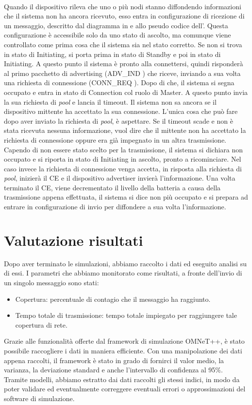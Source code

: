 \\
Quando il dispositivo rileva che uno o più nodi stanno diffondendo informazioni che il sistema non ha ancora ricevuto, esso entra in configurazione di ricezione di un messaggio, descritto dal diagramma in  e allo pseudo codice dell'. Questa configurazione è accessibile solo da uno stato di ascolto, ma comunque viene controllato come prima cosa che il sistema sia nel stato corretto. Se non si trova in stato di Initiating, si porta prima in stato di Standby e poi in stato di Initiating. A questo punto il sistema è pronto alla connettersi, quindi risponderà al primo pacchetto di advertising (ADV\_IND \cite{BT-CoreSpec4.0}) che riceve, inviando a sua volta una richiesta di connessione (CONN\_REQ \cite{BT-CoreSpec4.0}). Dopo di che, il sistema si segna occupato e entra in stato di Connection col ruolo di Master. A questo punto invia la sua richiesta di \textit{pool} e lancia il timeout. Il sistema non sa ancora se il dispositivo mittente ha accettato la sua connessione. L'unica cosa che può fare dopo aver inviato la richiesta di \textit{pool}, è aspettare. Se il timeout scade e non è stata ricevuta nessuna informazione, vuol dire che il mittente non ha accettato la richiesta di connessione oppure era già impegnato in un altra trasmissione. Capendo di non essere stato scelto per la trasmissione, il sistema si dichiara non occupato e si riporta in stato di Initiating in ascolto, pronto a ricominciare. Nel caso invece la richiesta di connessione venga accetta, in risposta alla richiesta di \textit{pool}, inizierà il \acs{CE} e il dispositivo advertiser invierà l'informazione. Una volta terminato il \acs{CE}, viene decrementato il livello della batteria a causa della trasmissione appena effettuata, il sistema si dice non più occupato e si prepara ad entrare in configurazione di invio per diffondere a sua volta l'informazione.
\bigskip

\section{Valutazione risultati}
Dopo aver terminato le simulazioni, abbiamo raccolto i dati ed eseguito analisi su di essi. I parametri che abbiamo monitorato come risultati, a fronte dell'invio di un singolo messaggio sono stati:
\begin{itemize}
	\item Copertura: percentuale di contagio che il messaggio ha raggiunto.
	\item Tempo totale di trasmissione: tempo totale impiegato per raggiungere tale copertura di rete.
\end{itemize}
Grazie alle funzionalità offerte dal framework di simulazione OMNeT++, è stato possibile raccogliere i dati in maniera efficiente. Con una manipolazione dei dati appena raccolti, il framework è stato in grado di fornirci il valor medio, la varianza, la deviazione standard e anche l'intervallo di confidenza al 95\%. Tramite modelli, abbiamo estratto dai dati raccolti gli stessi indici, in modo da poter validare ed eventualmente correggere eventuali errori o approssimazioni del software di simulazione.

